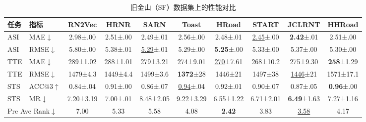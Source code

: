 \begin{table}[H]
    \centering
    \caption{旧金山（SF）数据集上的性能对比}
    \label{tab:HHRoad_sf}
    \small
    \setlength{\tabcolsep}{3pt}
    \begin{tabular}{ll|cccccccc}
        \hline
        \textbf{任务} & \textbf{指标} & \textbf{RN2Vec} & \textbf{HRNR} & \textbf{SARN} & \textbf{Toast} & \textbf{HRoad} & \textbf{START} & \textbf{JCLRNT} & \textbf{HHRoad} \\
        \hline
        ASI & MAE$\downarrow$ & 2.98\tiny{±.00} & 2.51\tiny{±.00} & 2.49\tiny{±.01} & 2.56\tiny{±.00} & 2.48\tiny{±.01} & \underline{2.45}\tiny{±.00} & \textbf{2.42}\tiny{±.01} & 2.51\tiny{±.00} \\
        ASI & RMSE$\downarrow$ & 5.80\tiny{±.00} & 5.38\tiny{±.01} & \underline{5.29}\tiny{±.01} & 5.29\tiny{±.00} & \textbf{5.25}\tiny{±.00} & 5.33\tiny{±.00} & 5.37\tiny{±.00} & 5.30\tiny{±.00} \\
        TTE & MAE$\downarrow$ & 289\tiny{±1.02} & 288\tiny{±1.01} & 279\tiny{±3.21} & 274\tiny{±9.01} & \underline{270}\tiny{±7.61} & 268\tiny{±10.2} & 275\tiny{±9.30} & \textbf{258}\tiny{±1.29} \\
        TTE & RMSE$\downarrow$ & 1479\tiny{±4.3} & 1449\tiny{±4.4} & 1499\tiny{±3.6} & \textbf{1372}\tiny{±28} & 1446\tiny{±21} & 1497\tiny{±38} & \underline{1446}\tiny{±21} & 1571\tiny{±17.1} \\
        STS & ACC@3$\uparrow$ & 0.84\tiny{±.04} & 0.91\tiny{±.00} & 0.86\tiny{±.07} & \underline{0.94}\tiny{±.04} & 0.92\tiny{±.01} & 0.90\tiny{±.07} & 0.87\tiny{±.05} & \textbf{0.96}\tiny{±.00} \\
        STS & MR$\downarrow$ & 7.20\tiny{±3.19} & 7.00\tiny{±.01} & 8.48\tiny{±2.05} & 9.22\tiny{±3.29} & \underline{6.55}\tiny{±1.22} & 6.71\tiny{±2.01} & \textbf{6.49}\tiny{±1.63} & 7.27\tiny{±1.16} \\
        \hline
        \multicolumn{2}{l|}{Pre Ave Rank$\downarrow$} & 7.00 & 5.33 & 5.58 & 4.08 & \textbf{2.42} & 3.83 & \underline{3.58} & 4.17 \\
        \hline
    \end{tabular}
\end{table}

